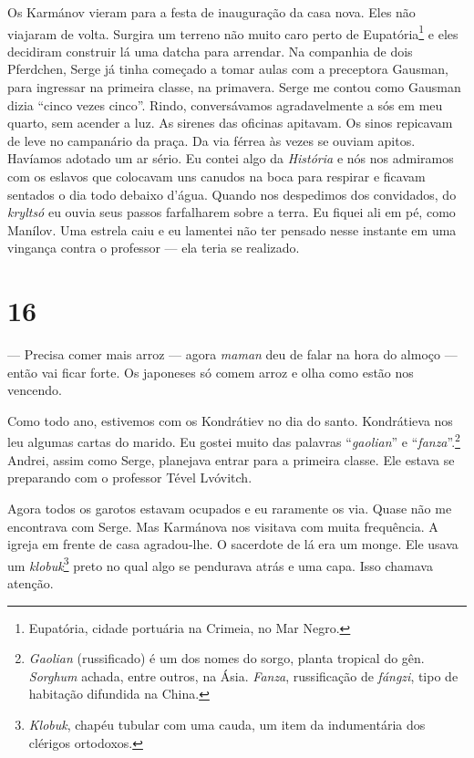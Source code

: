 Os Karmánov vieram para a festa de inauguração da casa nova. Eles não
viajaram de volta. Surgira um terreno não muito caro perto de
Eupatória\footnote{Eupatória, cidade portuária na Crimeia, no Mar Negro.}
e eles decidiram construir lá uma datcha para arrendar. Na companhia de
dois Pferdchen, Serge já tinha começado a tomar aulas com a preceptora
Gausman, para ingressar na primeira classe, na primavera. Serge me
contou como Gausman dizia ``cinco vezes cinco''. Rindo, conversávamos
agradavelmente a sós em meu quarto, sem acender a luz. As sirenes das
oficinas apitavam. Os sinos repicavam de leve no campanário da praça. Da
via férrea às vezes se ouviam apitos. Havíamos adotado um ar sério. Eu
contei algo da \emph{História} e nós nos admiramos com os eslavos que
colocavam uns canudos na boca para respirar e ficavam sentados o dia
todo debaixo d'água. Quando nos despedimos dos convidados, do
\emph{kryltsó} eu ouvia seus passos farfalharem sobre a terra. Eu fiquei
ali em pé, como Manílov. Uma estrela caiu e eu lamentei não ter pensado
nesse instante em uma vingança contra o professor --- ela teria se
realizado.

\section{16}

--- Precisa comer mais arroz --- agora \emph{maman} deu de falar na hora
do almoço --- então vai ficar forte. Os japoneses só comem arroz e olha
como estão nos vencendo.

Como todo ano, estivemos com os Kondrátiev no dia do santo. Kondrátieva
nos leu algumas cartas do marido. Eu gostei muito das palavras
``\emph{gaolian}'' e ``\emph{fanza}''.\footnote{\emph{Gaolian}
  (russificado) é um dos nomes do sorgo, planta tropical do gên.
  \emph{Sorghum} achada, entre outros, na Ásia. \emph{Fanza},
  russificação de \emph{fángzi}, tipo de habitação difundida na China.}
Andrei, assim como Serge, planejava entrar para a primeira classe. Ele
estava se preparando com o professor Tével Lvóvitch.

Agora todos os garotos estavam ocupados e eu raramente os via. Quase não
me encontrava com Serge. Mas Karmánova nos visitava com muita
frequência. A igreja em frente de casa agradou-lhe. O sacerdote de lá
era um monge. Ele usava um \emph{klobuk}\footnote{\emph{Klobuk}, chapéu
  tubular com uma cauda, um item da indumentária dos clérigos ortodoxos.}
preto no qual algo se pendurava atrás e uma capa. Isso chamava atenção.

